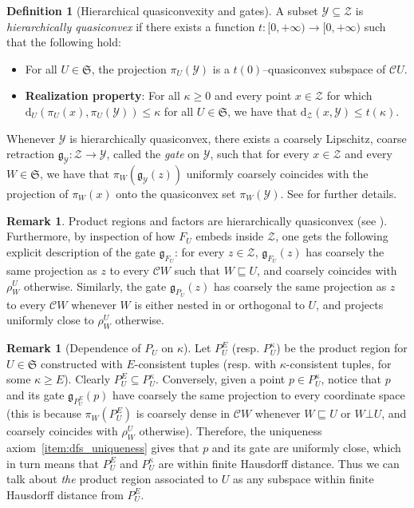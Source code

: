 \documentclass[svgnames]{amsart}
\theoremstyle{plain}
\theoremstyle{definition}
\newtheorem{defn}[thm]{Definition}
\newtheorem{rem}[thm]{Remark}
\newcommand{\frakS}{\mathfrak S}
\newcommand{\C}{\mathcal C}
\newcommand{\dist}{\mathrm{d}}
\newcommand{\nest}{\sqsubseteq}
\newcommand{\orth}{\bot}
\newcommand{\cuco}[1]{{\mathcal #1}}
\newcommand{\gate}{\mathfrak{g}}
\begin{document}
\begin{defn}[Hierarchical quasiconvexity and gates]\label{defn:hqc}
A subset $\cuco Y\subseteq \cuco Z$ is \emph{hierarchically quasiconvex} if there exists a function $t\colon[0,+\infty)\to [0,+\infty)$ such that the
following hold:
\begin{itemize}
    \item For all $U\in \frakS$, the projection $\pi_U(\cuco Y)$ is a $t(0)$–quasiconvex subspace of $\C U$.
    \item \textbf{Realization property}:
    For all $\kappa\ge 0$ and every point $x\in \cuco Z$ for which $\dist_U(\pi_U(x), \pi_U(\cuco Y))\le \kappa$ for all $U\in\frakS$, we have that $\dist_{\cuco Z}(x, \cuco Y)\le t(\kappa)$.
\end{itemize}
Whenever $\cuco Y$ is hierarchically quasiconvex, there exists a coarsely Lipschitz, coarse retraction $\gate_{\cuco Y} \colon \cuco Z\to \cuco Y$, called the \emph{gate} on $\cuco Y$, such that for every $x\in \cuco Z$ and every $W\in \frakS$, we have that
$ \pi_W(\gate_{\cuco Y}(z))$ uniformly coarsely coincides with the projection of $\pi_W(x)$ onto the quasiconvex set $\pi_W(\cuco Y)$. See \cite[Lemma 5.5]{HHS_II} for further details. 
\end{defn}

\begin{rem}\label{rem:factors_are_hqc}
    Product regions and factors are hierarchically quasiconvex (see \cite[Construction 5.10]{HHS_II}). Furthermore, by inspection of how $F_U$ embeds inside $\cuco Z$, one gets the following explicit description of the gate $\gate_{F_U}$: for every $z\in \cuco{Z}$, $\gate_{F_U}(z)$ has coarsely the same projection as $z$ to every $\C W$ such that $W\nest U$, and coarsely coincides with $\rho^{U}_W$ otherwise. Similarly, the gate  $\gate_{P_U}(z)$ has coarsely the same projection as $z$ to every $\C W$ whenever $W$ is either nested in or orthogonal to $U$, and projects uniformly close to $\rho^{U}_W$ otherwise.
\end{rem}

\begin{rem}[Dependence of $P_U$ on $\kappa$]\label{rem:dependence_of_PU_on_k}
    Let $P_U^E$ (resp. $P_U^\kappa$) be the product region for $U\in\frakS$ constructed with $E$-consistent tuples (resp. with $\kappa$-consistent tuples, for some $\kappa\ge E$). Clearly $P_U^E\subseteq P_U^\kappa$. Conversely, given a point $p\in P_U^\kappa$, notice that $p$ and its gate $\gate_{P_U^E}(p)$ have coarsely the same projection to every coordinate space (this is because $\pi_W(P_U^E)$ is coarsely dense in $\C W$ whenever $W\nest U$ or $W\orth U$, and coarsely coincides with $\rho^U_W$ otherwise). Therefore, the uniqueness axiom~\eqref{item:dfs_uniqueness} gives that $p$ and its gate are uniformly close, which in turn means that $P_U^E$ and $ P_U^\kappa$ are within finite Hausdorff distance. Thus we can talk about \emph{the} product region associated to $U$ as any subspace within finite Hausdorff distance from $P_U^E$. 
\end{rem}
\end{document}
